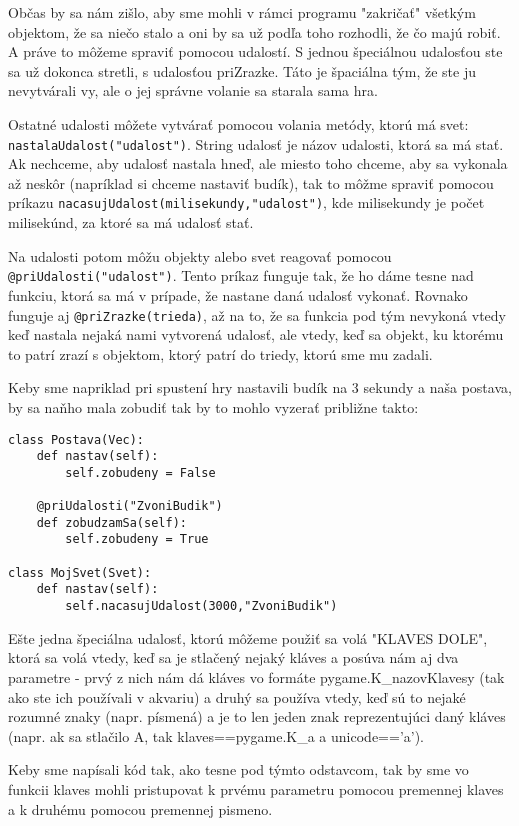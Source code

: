 Občas by sa nám zišlo, aby sme mohli v rámci programu "zakričať" všetkým objektom, že sa niečo stalo a oni by sa už podľa toho rozhodli, že čo majú robiť. A práve to môžeme spraviť pomocou udalostí. S jednou špeciálnou udalosťou ste sa už dokonca stretli, s udalosťou priZrazke. Táto je špaciálna tým, že ste ju nevytvárali vy, ale o jej správne volanie sa starala sama hra.

Ostatné udalosti môžete vytvárať pomocou volania metódy, ktorú má svet: \texttt{nastalaUdalost("udalost")}. String udalosť je názov udalosti, ktorá sa má stať. Ak nechceme, aby udalosť nastala hneď, ale miesto toho chceme, aby sa vykonala až neskôr (napríklad si chceme nastaviť budík), tak to môžme spraviť pomocou príkazu \texttt{nacasujUdalost(milisekundy,"udalost")}, kde milisekundy je počet milisekúnd, za ktoré sa má udalosť stať.

Na udalosti potom môžu objekty alebo svet reagovať pomocou \texttt{@priUdalosti("udalost")}. Tento príkaz funguje tak, že ho dáme tesne nad funkciu, ktorá sa má v prípade, že nastane daná udalosť vykonať. Rovnako funguje aj \texttt{@priZrazke(trieda)}, až na to, že sa funkcia pod tým nevykoná vtedy keď nastala nejaká nami vytvorená udalosť, ale vtedy, keď sa objekt, ku ktorému to patrí zrazí s objektom, ktorý patrí do triedy, ktorú sme mu zadali.

Keby sme napriklad pri spustení hry nastavili budík na 3 sekundy a naša postava, by sa naňho mala zobudiť tak by to mohlo vyzerať približne takto:

\begin{lstlisting}
class Postava(Vec):
    def nastav(self):
        self.zobudeny = False
    
    @priUdalosti("ZvoniBudik")
    def zobudzamSa(self):
        self.zobudeny = True

class MojSvet(Svet):
	def nastav(self):
		self.nacasujUdalost(3000,"ZvoniBudik")
\end{lstlisting}

Ešte jedna špeciálna udalosť, ktorú môžeme použiť sa volá "KLAVES DOLE", ktorá sa volá vtedy, keď sa je stlačený nejaký kláves a posúva nám aj dva parametre - prvý z nich nám dá kláves vo formáte pygame.K\_nazovKlavesy (tak ako ste ich používali v akvariu) a druhý sa používa vtedy, keď sú to nejaké rozumné znaky (napr. písmená) a je to len jeden znak reprezentujúci daný kláves (napr. ak sa stlačilo A, tak klaves==pygame.K\_a a unicode=='a').

Keby sme napísali kód tak, ako tesne pod týmto odstavcom, tak by sme vo funkcii klaves mohli pristupovat k prvému parametru pomocou premennej klaves a k druhému pomocou premennej pismeno.

